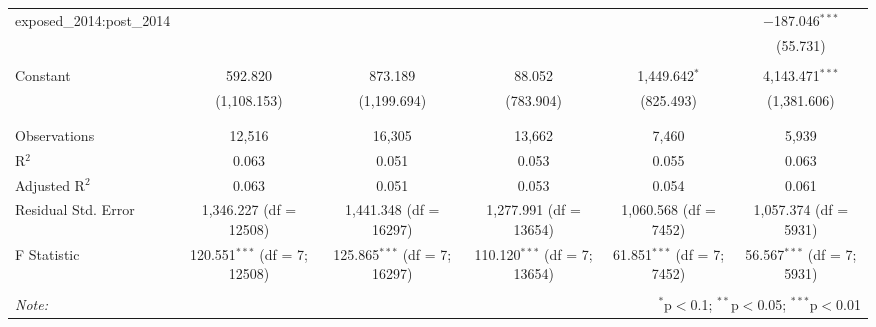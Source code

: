 \begin{table}[!htbp]
\begin{adjustbox}{width=\textwidth}
\begin{tabular}{@{\extracolsep{5pt}}lccccc}
 exposed\_2014:post\_2014 &  &  &  &  & $-$187.046$^{***}$ \\ 
  &  &  &  &  & (55.731) \\ 
  & & & & & \\ 
 Constant & 592.820 & 873.189 & 88.052 & 1,449.642$^{*}$ & 4,143.471$^{***}$ \\ 
  & (1,108.153) & (1,199.694) & (783.904) & (825.493) & (1,381.606) \\ 
  & & & & & \\ 
\hline \\[-1.8ex] 
Observations & 12,516 & 16,305 & 13,662 & 7,460 & 5,939 \\ 
R$^{2}$ & 0.063 & 0.051 & 0.053 & 0.055 & 0.063 \\ 
Adjusted R$^{2}$ & 0.063 & 0.051 & 0.053 & 0.054 & 0.061 \\ 
Residual Std. Error & 1,346.227 (df = 12508) & 1,441.348 (df = 16297) & 1,277.991 (df = 13654) & 1,060.568 (df = 7452) & 1,057.374 (df = 5931) \\ 
F Statistic & 120.551$^{***}$ (df = 7; 12508) & 125.865$^{***}$ (df = 7; 16297) & 110.120$^{***}$ (df = 7; 13654) & 61.851$^{***}$ (df = 7; 7452) & 56.567$^{***}$ (df = 7; 5931) \\ 
\hline 
\hline \\[-1.8ex] 
\textit{Note:}  & \multicolumn{5}{r}{$^{*}$p$<$0.1; $^{**}$p$<$0.05; $^{***}$p$<$0.01} \\ 
\end{tabular} 
\end{adjustbox}
\end{table} 
